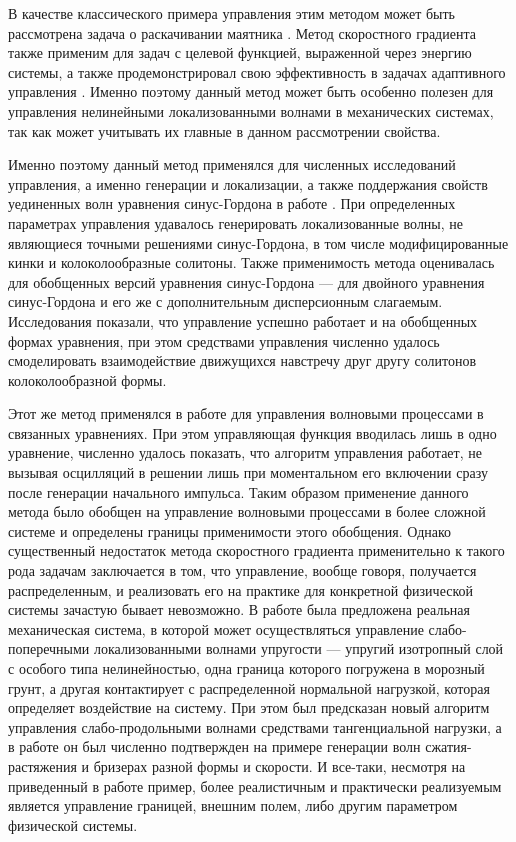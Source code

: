 В качестве классического примера управления этим методом может быть рассмотрена задача о раскачивании маятника \cite{intro_akulenko}. Метод скоростного градиента также применим для задач с целевой функцией, выраженной через энергию системы, а также продемонстрировал свою эффективность в задачах адаптивного управления \cite{intro_fradkov_scheme, intro_fomin, intro_fradkov_adapt}. Именно поэтому данный метод может быть особенно полезен для управления нелинейными локализованными волнами в механических системах, так как может учитывать их главные в данном рассмотрении свойства.

Именно поэтому данный метод применялся для численных исследований управления, а именно генерации и локализации, а также поддержания свойств уединенных волн уравнения синус-Гордона в работе \cite{porant16}. При определенных параметрах управления удавалось генерировать локализованные волны, не являющиеся точными решениями синус-Гордона, в том числе модифицированные кинки и колоколообразные солитоны. Также применимость метода оценивалась для обобщенных версий уравнения синус-Гордона --- для двойного уравнения синус-Гордона и его же с дополнительным дисперсионным слагаемым. Исследования показали, что управление успешно работает и на обобщенных формах уравнения, при этом средствами управления численно удалось смоделировать взаимодействие движущихся навстречу друг другу солитонов колоколообразной формы.

Этот же метод применялся в работе \cite{porant17} для управления волновыми процессами в связанных уравнениях. При этом управляющая функция вводилась лишь в одно уравнение, численно удалось показать, что алгоритм управления работает, не вызывая осцилляций в решении лишь при моментальном его включении сразу после генерации начального импульса. Таким образом применение данного метода было обобщен на управление волновыми процессами в более сложной системе и определены границы применимости этого обобщения.
Однако существенный недостаток метода скоростного градиента применительно к такого рода задачам заключается в том, что управление, вообще говоря, получается распределенным, и реализовать его на практике для конкретной физической системы зачастую бывает невозможно. В работе \cite{PorubovAntonov2018mechSystem} была предложена реальная механическая система, в которой может осуществляться управление слабо-поперечными локализованными волнами упругости --- упругий изотропный слой с особого типа нелинейностью, одна граница которого погружена в морозный грунт, а другая контактирует с распределенной нормальной нагрузкой, которая определяет воздействие на систему. При этом был предсказан новый алгоритм управления слабо-продольными волнами средствами тангенциальной нагрузки, а в работе \cite{PorubovAntonov2017JoPFurther} он был численно подтвержден на примере генерации волн сжатия-растяжения и бризерах разной формы и скорости. И все-таки, несмотря на приведенный в работе пример, более реалистичным и практически реализуемым является управление границей, внешним полем, либо другим параметром физической системы.

